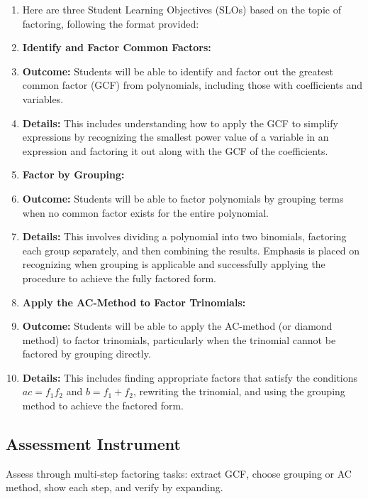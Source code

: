 \begin{enumerate}
    \item Here are three Student Learning Objectives (SLOs) based on the topic of factoring, following the format provided:
    \item \textbf{Identify and Factor Common Factors:}
    \item \textbf{Outcome:} Students will be able to identify and factor out the greatest common factor (GCF) from polynomials, including those with coefficients and variables.
    \item \textbf{Details:} This includes understanding how to apply the GCF to simplify expressions by recognizing the smallest power value of a variable in an expression and factoring it out along with the GCF of the coefficients.
    \item \textbf{Factor by Grouping:}
    \item \textbf{Outcome:} Students will be able to factor polynomials by grouping terms when no common factor exists for the entire polynomial.
    \item \textbf{Details:} This involves dividing a polynomial into two binomials, factoring each group separately, and then combining the results. Emphasis is placed on recognizing when grouping is applicable and successfully applying the procedure to achieve the fully factored form.
    \item \textbf{Apply the AC-Method to Factor Trinomials:}
    \item \textbf{Outcome:} Students will be able to apply the AC-method (or diamond method) to factor trinomials, particularly when the trinomial cannot be factored by grouping directly.
    \item \textbf{Details:} This includes finding appropriate factors that satisfy the conditions $ac = f _1f _2$ and $b = f _1 + f _2$, rewriting the trinomial, and using the grouping method to achieve the factored form.
\end{enumerate}


\subsection{Assessment Instrument}
\label{ssec:asse-3669}


Assess through multi-step factoring tasks: extract GCF, choose grouping
or AC method, show each step, and verify by expanding.


